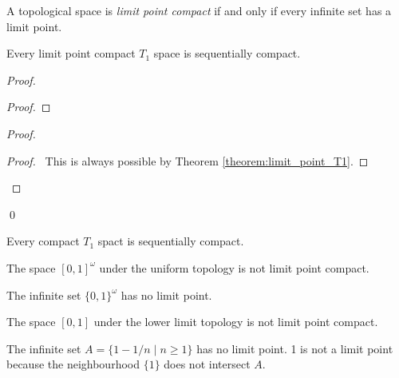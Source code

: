 \begin{definition}
    A topological space is \emph{limit point compact} if and only if every
    infinite set has a limit point.
\end{definition}

\begin{proposition}
    \label{proposition:limit_point_compact_sequentially_compact}
    Every limit point compact $T_1$ space is sequentially compact.
\end{proposition}

\begin{proof}
    \pf
    \begin{proof}
    \end{proof}
    \begin{proof}
        \begin{proof}
            \pf\ This is always possible by Theorem \ref{theorem:limit_point_T1}.
        \end{proof}
    \end{proof}
    \qed
\end{proof}

\begin{corollary}
    \label{corollary:compact_sequentially_compact}
    Every compact $T_1$ spact is sequentially compact.
\end{corollary}

\begin{example}
    The space $[0,1]^\omega$ under the uniform topology is not limit point compact.

    The infinite set $\{0,1\}^\omega$ has no limit point.
\end{example}

\begin{example}
    The space $[0,1]$ under the lower limit topology is not limit point compact.

    The infinite set $A = \{ 1 - 1/n \mid n \geq 1 \}$ has no limit point. 1 is not a limit point
    because the neighbourhood $\{1\}$ does not intersect $A$.
\end{example}

